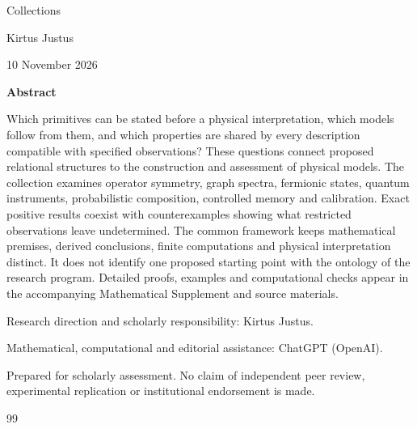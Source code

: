 \documentclass[11pt,a4paper]{article}
\begin{document}
\begin{titlepage}
\vspace*{12mm}
{\huge\bfseries\raggedright{} \ProgramTitle\par}
\vspace{9mm}
{\Large Collections\par}
\vspace{14mm}
Kirtus Justus\par
\AuthorLocation\par
10 November 2026\par
\vspace{12mm}
\textbf{Abstract}\par
Which primitives can be stated before a physical interpretation, which models
follow from them, and which properties are shared by every description
compatible with specified observations? These questions connect proposed
relational structures to the construction and assessment of physical models. The collection examines
operator symmetry, graph spectra, fermionic states, quantum instruments,
probabilistic composition, controlled memory and calibration. Exact positive
results coexist with counterexamples showing what restricted observations leave
undetermined. The common framework keeps mathematical premises, derived
conclusions, finite computations and physical interpretation distinct. It does
not identify one proposed starting point with the ontology of the research
program. Detailed proofs, examples and computational checks appear in the
accompanying Mathematical Supplement and source materials.\par
\vfill
Research direction and scholarly responsibility: Kirtus Justus.\par
Mathematical, computational and editorial assistance: ChatGPT (OpenAI).\par
Prepared for scholarly assessment. No claim of independent peer review,
experimental replication or institutional endorsement is made.\par
\end{titlepage}
\setcounter{page}{2}


\clearpage
\begin{thebibliography}{99}


\end{thebibliography}
\end{document}
